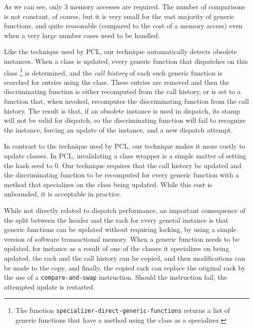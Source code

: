 As we can see, only 3 memory accesses are required.  The number of
comparisons is not constant, of course, but it is very small for the
vast majority of generic functions, and quite reasonable (compared to
the cost of a memory access) even when a very large number cases need
to be handled. 

Like the technique used by PCL, our technique automatically detects
obsolete instances.  When a class is updated, every generic function
that dispatches on this class%
\footnote{The function
  \texttt{specializer-direct-generic-functions} returns a list of
  generic functions that have a method using the class as a specializer.}
is determined, and the \emph{call history} of each such generic
function is searched for entries using the class.  These entries are
removed and then the discriminating function is either recomputed from
the call history, or is set to a function that, when invoked,
recomputes the discriminating function from the call history.   The
result is that, if an obsolete instance is used in dispatch, its stamp
will not be valid for dispatch, so the discriminating function will
fail to recognize the instance, forcing an update of the instance, and
a new dispatch attempt. 

In contrast to the technique used by PCL, our technique makes it more
costly to update classes.  In PCL, invalidating a class wrapper is a
simple matter of setting the hash seed to $0$.  Our technique requires
that the call history be updated and the discriminating function to be
recomputed for every generic function with a method that specializes
on the class being updated.  While this cost is unbounded, it is
acceptable in practice. 

While not directly related to dispatch performance, an important
consequence of the split between the header and the rack for every
general instance is that generic functions can be updated without
requiring locking, by using a simple version of software transactional
memory.  When a generic function needs to be updated, for instance as
a result of one of the classes it specializes on being updated, the
rack and the call history can be copied, and then modifications can be
made to the copy, and finally, the copied rack can replace the
original rack by the use of a \texttt{compare-and-swap} instruction.
Should the instruction fail, the attempted update is restarted. 

